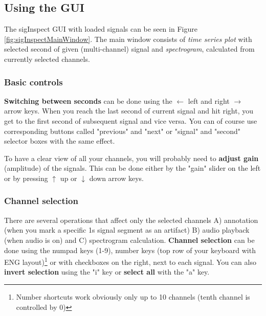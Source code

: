 \documentclass[a4paper,10pt]{article}
\begin{document}
\subsection{Using the GUI}

The sigInspect GUI with loaded signals can be seen in Figure \ref{fig:sigInspectMainWindow}. The main window consists of \emph{time series plot} with selected second of given (multi-channel) signal and \emph{spectrogram}, calculated from currently selected channels.


\subsubsection{Basic controls}
\textbf{Switching between seconds} can be done using the $\leftarrow$ left and right $\rightarrow$ arrow keys. When you reach the last second of current signal and hit right, you get to the first second of subsequent signal and vice versa. You can of course use corresponding buttons called "previous" and "next" or "signal" and "second" selector boxes with the same effect.

To have a clear view of all your channels, you will probably need to \textbf{adjust gain} (amplitude) of the signals. This can be done either by the "gain" slider on the left or by pressing $\uparrow$ up or $\downarrow$ down arrow keys.

\subsubsection{Channel selection}
There are several operations that affect only the selected channels A) annotation (when you mark a specific 1s signal segment as an artifact) B) audio playback (when audio is on) and C) spectrogram calculation. \textbf{Channel selection} can be done using the numpad keys (1-9), number keys (top row of your keyboard with ENG layout)\footnote{Number shortcuts work obviously only up to 10 channels (tenth channel is controlled by 0)} or with checkboxes on the right, next to each signal. You can also \textbf{invert selection} using the "i" key or \textbf{select all} with the "a" key.
\end{document}
